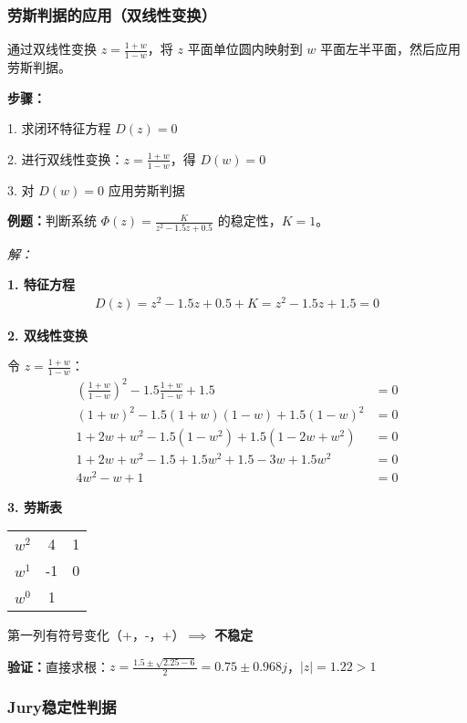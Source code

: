 \subsubsection{劳斯判据的应用（双线性变换）}

通过双线性变换 $z = \frac{1+w}{1-w}$，将 $z$ 平面单位圆内映射到 $w$ 平面左半平面，然后应用劳斯判据。

\textbf{步骤：}

1. 求闭环特征方程 $D(z) = 0$

2. 进行双线性变换：$z = \frac{1+w}{1-w}$，得 $D(w) = 0$

3. 对 $D(w) = 0$ 应用劳斯判据

\vspace{0.3cm}
\textbf{例题：}判断系统 $\Phi(z) = \frac{K}{z^2 - 1.5z + 0.5}$ 的稳定性，$K = 1$。

\textit{解：}

\textbf{1. 特征方程}
\begin{align*}
D(z) = z^2 - 1.5z + 0.5 + K = z^2 - 1.5z + 1.5 = 0
\end{align*}

\textbf{2. 双线性变换}

令 $z = \frac{1+w}{1-w}$：
\begin{align*}
\left(\frac{1+w}{1-w}\right)^2 - 1.5\frac{1+w}{1-w} + 1.5 &= 0 \\
(1+w)^2 - 1.5(1+w)(1-w) + 1.5(1-w)^2 &= 0 \\
1 + 2w + w^2 - 1.5(1-w^2) + 1.5(1-2w+w^2) &= 0 \\
1 + 2w + w^2 - 1.5 + 1.5w^2 + 1.5 - 3w + 1.5w^2 &= 0 \\
4w^2 - w + 1 &= 0
\end{align*}

\textbf{3. 劳斯表}
\begin{center}
\begin{tabular}{c|cc}
$w^2$ & 4 & 1 \\
$w^1$ & -1 & 0 \\
$w^0$ & 1 &  \\
\end{tabular}
\end{center}

第一列有符号变化（+，-，+）$\implies$ \textbf{不稳定}

\textbf{验证：}直接求根：$z = \frac{1.5 \pm \sqrt{2.25-6}}{2} = 0.75 \pm 0.968j$，$|z| = 1.22 > 1$

\subsubsection{Jury稳定性判据}

